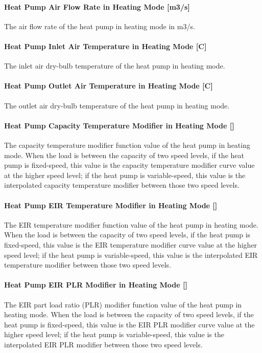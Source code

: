 \paragraph{Heat Pump Air Flow Rate in Heating Mode {[}m3/s{]}}
The air flow rate of the heat pump in heating mode in m3/s.
\paragraph{Heat Pump Inlet Air Temperature in Heating Mode {[}C{]}}
The inlet air dry-bulb temperature of the heat pump in heating mode.
\paragraph{Heat Pump Outlet Air Temperature in Heating Mode {[}C{]}}
The outlet air dry-bulb temperature of the heat pump in heating mode.
\paragraph{Heat Pump Capacity Temperature Modifier in Heating Mode {[}{]}}
The capacity temperature modifier function value of the heat pump in heating
mode. When the load is between the capacity of two speed levels, if the heat
pump is fixed-speed, this value is the capacity temperature modifier curve value
at the higher speed level; if the heat pump is variable-speed, this value is the
interpolated capacity temperature modifier between those two speed levels.
\paragraph{Heat Pump EIR Temperature Modifier in Heating Mode {[}{]}}
The EIR temperature modifier function value of the heat pump in heating
mode. When the load is between the capacity of two speed levels, if the heat
pump is fixed-speed, this value is the EIR temperature modifier curve value
at the higher speed level; if the heat pump is variable-speed, this value is the
interpolated EIR temperature modifier between those two speed levels.
\paragraph{Heat Pump EIR PLR Modifier in Heating Mode {[}{]}}
The EIR part load ratio (PLR) modifier function value of the heat pump in heating
mode. When the load is between the capacity of two speed levels, if the heat
pump is fixed-speed, this value is the EIR PLR modifier curve value
at the higher speed level; if the heat pump is variable-speed, this value is the
interpolated EIR PLR modifier between those two speed levels.
